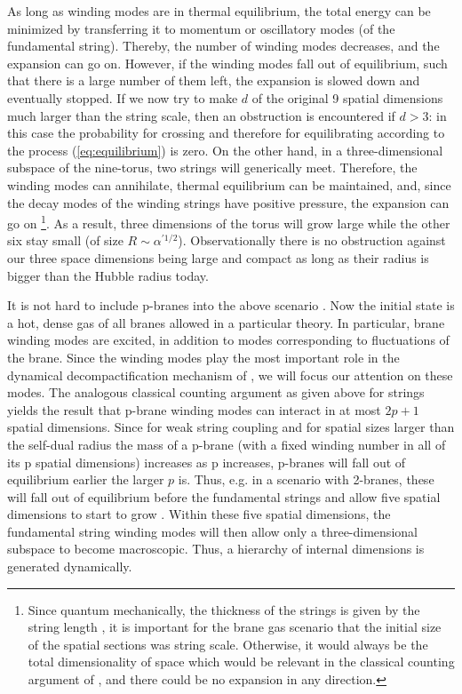 \documentclass[a4paper,twocolumn,nofootinbib,tightenlines,prd,aps,
               superscriptaddress]{revtex4} %
\newcommand{\al}{\alpha}
\begin{document}
As long as winding modes are in thermal equilibrium, the total
energy can be minimized  by transferring it to momentum or
oscillatory  modes (of the fundamental string). Thereby, the
number of winding modes decreases, and the expansion can go on.
However, if the winding modes fall out of equilibrium, such that
there is a large number of them left, the expansion is slowed down
and eventually stopped. If we now try to make $d$ of the original
9 spatial dimensions much larger than the string scale, then an
obstruction is encountered if $d > 3$: in this case the
probability for crossing and therefore for equilibrating according
to the process (\ref{eq:equilibrium}) is zero. On the other hand,
in a three-dimensional subspace of the nine-torus, two strings
will generically meet. Therefore, the winding modes can
annihilate, thermal equilibrium can be maintained, and, since the
decay modes of the winding strings have positive pressure, the
expansion can go on \footnote{Since quantum mechanically, the
thickness of the strings is given by the string length
\cite{Karliner:1988hd}, it is important for the brane gas scenario
that the initial size of the spatial sections was string scale.
Otherwise, it would always be the total dimensionality of space
which would be relevant in the classical counting argument of
\cite{Brandenberger:1989aj}, and there could be no expansion in
any direction.}. As a result, three dimensions of the torus will
grow large while the other six stay small (of size $R \sim
\al^{'1/2}$).  Observationally there is no obstruction against
our three space dimensions being
large and compact as long as their radius is bigger than
the Hubble radius today.

It is not hard to include p-branes into the above scenario
\cite{Alexander:2000xv}. Now the initial state is a hot, dense gas
of all branes allowed in a particular theory. In particular, brane
winding modes are excited, in addition to modes corresponding to
fluctuations of the brane. Since the winding modes play the most
important role in the dynamical decompactification mechanism of
\cite{Brandenberger:1989aj,Alexander:2000xv}, we will focus our
attention on these modes. The analogous classical counting
argument as given above for strings yields the result that p-brane
winding modes can interact in at most $2p+1$ spatial dimensions.
Since for weak string coupling and for spatial sizes larger than
the self-dual radius the mass of a p-brane (with a fixed winding
number in all of its p spatial dimensions) increases as p
increases, p-branes will fall out of equilibrium earlier the
larger $p$ is. Thus, e.g. in a scenario with 2-branes, these will
fall out of equilibrium before the fundamental strings and allow
five spatial dimensions to start to grow \cite{Alexander:2000xv}.
Within these five spatial dimensions, the fundamental string
winding modes will then allow only a three-dimensional subspace to
become macroscopic. Thus, a hierarchy of internal dimensions is
generated dynamically.
\end{document}
